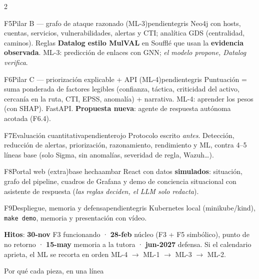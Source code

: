 \documentclass[9pt,a4paper]{extarticle}
\newcommand{\cod}[1]{\texttt{#1}}
\newcommand{\fl}{$\rightarrow$}
\newcommand{\pend}{pendiente}
\begin{document}
\begin{multicols}{2}
\begin{fase}{F5}{Pilar B — grafo de ataque razonado (ML-3)}{\pend}{gris}
Neo4j con hosts, cuentas, servicios, vulnerabilidades, alertas y CTI; analítica GDS (centralidad,
caminos). Reglas \textbf{Datalog estilo MulVAL} en Soufflé que usan la \textbf{evidencia observada}.
ML-3: predicción de enlaces con GNN; \textit{el modelo propone, Datalog verifica}.
\end{fase}

\begin{fase}{F6}{Pilar C — priorización explicable + API (ML-4)}{\pend}{gris}
Puntuación = suma ponderada de factores legibles (confianza, táctica, criticidad del activo, cercanía en
la ruta, CTI, EPSS, anomalía) + narrativa. ML-4: aprender los pesos (con SHAP). FastAPI.
\textcolor{violeta}{\textbf{Propuesta nueva}: agente de respuesta autónoma acotada (F6.4).}
\end{fase}

\begin{fase}{F7}{Evaluación cuantitativa}{\pend}{rojo}
Protocolo escrito \textit{antes}. Detección, reducción de alertas, priorización, razonamiento,
rendimiento y ML, contra 4–5 líneas base (solo Sigma, sin anomalías, severidad de regla, Wazuh\ldots).
\end{fase}

\begin{fase}{F8}{Portal web (extra)}{base hecha}{ambar}
React con datos \textbf{simulados}: situación, grafo del pipeline, cuadros de Grafana y demo de
conciencia situacional con asistente de respuesta (\textit{las reglas deciden, el LLM solo redacta}).
\end{fase}

\begin{fase}{F9}{Despliegue, memoria y defensa}{\pend}{gris}
Kubernetes local (minikube/kind), \cod{make demo}, memoria y presentación con vídeo.
\end{fase}

\small
\textbf{Hitos}: \textbf{30-nov} F3 funcionando · \textbf{28-feb} núcleo (F3 + F5 simbólico), punto de no retorno ·
\textbf{15-may} memoria a la tutora · \textbf{jun-2027} defensa. Si el calendario aprieta, el ML se recorta
en orden ML-4 \fl{} ML-1 \fl{} ML-3 \fl{} ML-2.
\normalsize

\end{multicols}

\newpage
\begin{tcolorbox}[enhanced,colback=azul,colframe=azul,arc=2pt,left=6pt,right=6pt,top=3pt,bottom=3pt]
\color{white}{\large\bfseries Tecnologías: qué son y por qué se usan}\hfill{\small Por qué cada pieza, en una línea}
\end{tcolorbox}
\end{document}
